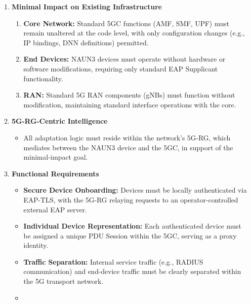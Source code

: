 \begin{enumerate}
    \item {
        \textbf{Minimal Impact on Existing Infrastructure}
        \begin{enumerate}
            \item {
                \textbf{Core Network:} Standard \acl{5GC} functions (\acl{AMF}, \acl{SMF}, \acl{UPF}) must remain unaltered at the code level, with only configuration changes (e.g., \ac{IP} bindings, \ac{DNN} definitions) permitted.
            }
            \item {
                \textbf{End Devices:} \ac{NAUN3} devices must operate without hardware or software modifications, requiring only standard \ac{EAP} Supplicant functionality.
            }
            \item {
                \textbf{\acl{RAN}:} Standard \ac{5G} \ac{RAN} components (\acp{gNB}) must function without modification, maintaining standard interface operations with the core.
            }
        \end{enumerate}
    }
    \item {
        \textbf{\ac{5G-RG}-Centric Intelligence}
        \begin{itemize}
            \item {
                All adaptation logic must reside within the network's \ac{5G-RG}, which mediates between the \ac{NAUN3} device and the \ac{5GC}, in support of the minimal-impact goal.
            }
        \end{itemize}
    }
    \item {
        \textbf{Functional Requirements}
        \begin{itemize}
            \item {
                \textbf{Secure Device Onboarding:} Devices must be locally authenticated via \ac{EAP-TLS}, with the \ac{5G-RG} relaying requests to an operator-controlled external \ac{EAP} server.
            }
            \item {
                \textbf{Individual Device Representation:} Each authenticated device must be assigned a unique \ac{PDU} Session within the \ac{5GC}, serving as a proxy identity.
            }
            \item {
                \textbf{Traffic Separation:} Internal service traffic (e.g., \ac{RADIUS} communication) and end-device traffic must be clearly separated within the \ac{5G} transport network.
            }
            \item {
}
\end{itemize}}
\end{enumerate}
